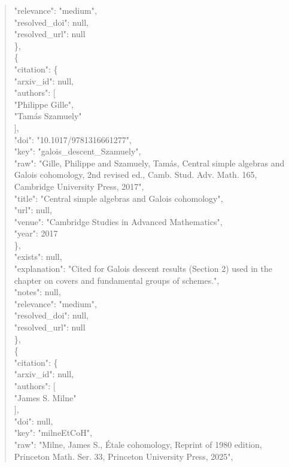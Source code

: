 \documentclass[11pt]{article}
\begin{document}
\begin{quote}
      "relevance": "medium",\\
      "resolved\_doi": null,\\
      "resolved\_url": null\\
    \},\\
    \{\\
      "citation": \{\\
        "arxiv\_id": null,\\
        "authors": [\\
          "Philippe Gille",\\
          "Tamás Szamuely"\\
        ],\\
        "doi": "10.1017/9781316661277",\\
        "key": "galois\_descent\_Szamuely",\\
        "raw": "Gille, Philippe and Szamuely, Tamás, Central simple algebras and Galois cohomology, 2nd revised ed., Camb. Stud. Adv. Math. 165, Cambridge University Press, 2017",\\
        "title": "Central simple algebras and Galois cohomology",\\
        "url": null,\\
        "venue": "Cambridge Studies in Advanced Mathematics",\\
        "year": 2017\\
      \},\\
      "exists": null,\\
      "explanation": "Cited for Galois descent results (Section 2) used in the chapter on covers and fundamental groups of schemes.",\\
      "notes": null,\\
      "relevance": "medium",\\
      "resolved\_doi": null,\\
      "resolved\_url": null\\
    \},\\
    \{\\
      "citation": \{\\
        "arxiv\_id": null,\\
        "authors": [\\
          "James S. Milne"\\
        ],\\
        "doi": null,\\
        "key": "milneEtCoH",\\
        "raw": "Milne, James S., Étale cohomology, Reprint of 1980 edition, Princeton Math. Ser. 33, Princeton University Press, 2025",\\

\end{quote}
\end{document}
